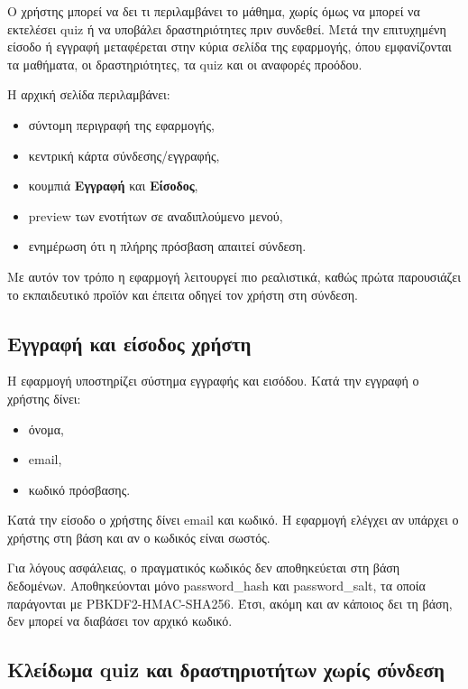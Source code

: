 \documentclass[12pt,a4paper]{article}
\newcommand{\textlatin}[1]{\textenglish{#1}}
\begin{document}
Ο χρήστης μπορεί να δει τι περιλαμβάνει το μάθημα, χωρίς όμως να μπορεί να εκτελέσει quiz ή να υποβάλει δραστηριότητες πριν συνδεθεί. Μετά την επιτυχημένη είσοδο ή εγγραφή μεταφέρεται στην κύρια σελίδα της εφαρμογής, όπου εμφανίζονται τα μαθήματα, οι δραστηριότητες, τα quiz και οι αναφορές προόδου.

Η αρχική σελίδα περιλαμβάνει:

\begin{itemize}[leftmargin=1.2cm]
  \item σύντομη περιγραφή της εφαρμογής,
  \item κεντρική κάρτα σύνδεσης/εγγραφής,
  \item κουμπιά \textbf{Εγγραφή} και \textbf{Είσοδος},
  \item preview των ενοτήτων σε αναδιπλούμενο μενού,
  \item ενημέρωση ότι η πλήρης πρόσβαση απαιτεί σύνδεση.
\end{itemize}

Με αυτόν τον τρόπο η εφαρμογή λειτουργεί πιο ρεαλιστικά, καθώς πρώτα παρουσιάζει το εκπαιδευτικό προϊόν και έπειτα οδηγεί τον χρήστη στη σύνδεση.

\subsection{Εγγραφή και είσοδος χρήστη}

Η εφαρμογή υποστηρίζει σύστημα εγγραφής και εισόδου. Κατά την εγγραφή ο χρήστης δίνει:

\begin{itemize}[leftmargin=1.2cm]
  \item όνομα,
  \item email,
  \item κωδικό πρόσβασης.
\end{itemize}

Κατά την είσοδο ο χρήστης δίνει email και κωδικό. Η εφαρμογή ελέγχει αν υπάρχει ο χρήστης στη βάση και αν ο κωδικός είναι σωστός.

Για λόγους ασφάλειας, ο πραγματικός κωδικός δεν αποθηκεύεται στη βάση δεδομένων. Αποθηκεύονται μόνο \textlatin{password\_hash} και \textlatin{password\_salt}, τα οποία παράγονται με \textlatin{PBKDF2-HMAC-SHA256}. Έτσι, ακόμη και αν κάποιος δει τη βάση, δεν μπορεί να διαβάσει τον αρχικό κωδικό.

\subsection{Κλείδωμα quiz και δραστηριοτήτων χωρίς σύνδεση}
\end{document}
